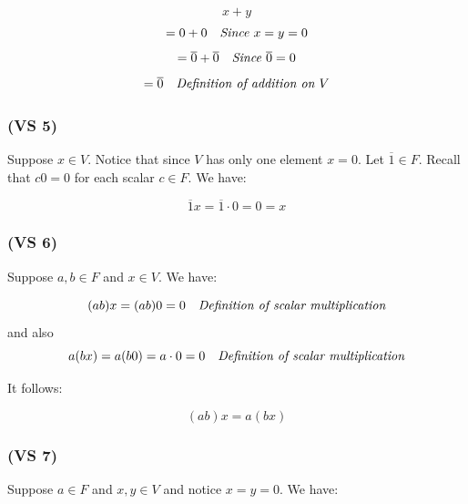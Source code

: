 \documentclass{article}
\begin{document}
\begin{equation*}
    x + y 
\end{equation*}
\begin{equation*}
    = 0 + 0  \ \ \ \emph{Since \(x = y = 0\)}
\end{equation*}
\begin{equation*}
    = \overline{0} + \overline{0} \ \ \ \emph{Since \(\overline{0} = 0\)}
\end{equation*}
\begin{equation*}
    = \overline{0} \ \ \ \emph{Definition of addition on \(V\)}
\end{equation*}

\subsubsection*{(VS 5)}

Suppose \(x \in V\). Notice that since \(V\) has only one element
\(x = 0\). Let \(\overline{1} \in F\). Recall that \(c0 = 0\) for each scalar \(c \in F\).
We have:

\begin{equation*}
    \overline{1}x = \overline{1} \cdot 0 = 0 = x
\end{equation*}

\subsubsection*{(VS 6)}

Suppose \(a, b \in F\) and \(x \in V\). We have:

\begin{equation*}
    (ab)x = (ab)0 = 0 \ \ \ \emph{Definition of scalar multiplication}
\end{equation*}
and also
\begin{equation*}
    a(bx) = a(b0) = a \cdot 0 = 0 \ \ \ \emph{Definition of scalar multiplication}
\end{equation*}

It follows:

\begin{equation*}
    (ab)x = a(bx)
\end{equation*}

\subsubsection*{(VS 7)}

Suppose \(a \in F\) and \(x, y \in V\) and notice \(x = y = 0\). We have:
\end{document}
